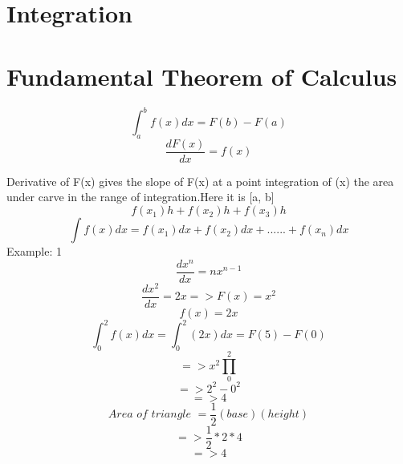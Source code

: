 \section{Integration}
\newpage
\section{Fundamental Theorem of Calculus}

\begin{equation}
\int_{a}^{b}f(x)dx=F(b)-F(a)
\end{equation}
\begin{equation}
\frac{dF(x)}{dx}=f(x)
\end{equation}

Derivative of F(x) gives the slope of F(x) at a point integration of (x) the area under carve in the range of integration.Here it is [a, b]
\newline
\begin{equation}
f(x_1)h+f(x_2)h+f(x_3)h
\end{equation}
\begin{equation}
\int f(x)dx=f(x_1)dx+f(x_2)dx+......+f(x_n)dx
\end{equation}
Example: 1
\begin{equation}
\frac{dx^n}{dx} = nx^{n-1}
\end{equation}
\begin{equation}
\frac{dx^2}{dx} = 2x => F(x)=x^2
\end{equation}
\begin{displaymath}
f(x) = 2x
\end{displaymath}
\begin{displaymath}
\int_{0}^{2}f(x)dx=\int_{0}^{2}(2x)dx = F(5)-F(0)
\end{displaymath}
\begin{displaymath}
=> x^2\prod_{0}^{2}
\end{displaymath}
\begin{displaymath}
=>2^2-0^2
\end{displaymath}
\begin{displaymath}
=>4
\end{displaymath}
\newline
\begin{equation}
Area \,\, of \,\, triangle\,\, = \frac{1}{2}(base)(height)
\end{equation}
\begin{displaymath}
=>\frac{1}{2}*2*4
\end{displaymath}
\begin{displaymath}
=> 4
\end{displaymath}
